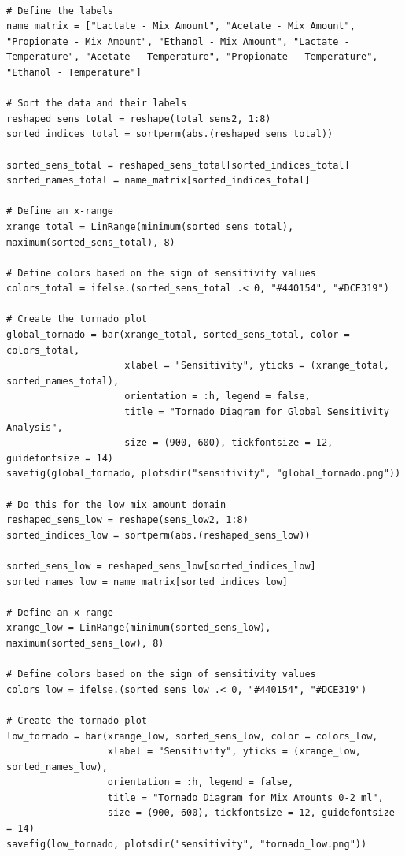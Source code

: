 \documentclass[11pt]{article}
\begin{document}
\begin{verbatim}

# Define the labels
name_matrix = ["Lactate - Mix Amount", "Acetate - Mix Amount", "Propionate - Mix Amount", "Ethanol - Mix Amount", "Lactate - Temperature", "Acetate - Temperature", "Propionate - Temperature", "Ethanol - Temperature"]

# Sort the data and their labels
reshaped_sens_total = reshape(total_sens2, 1:8)
sorted_indices_total = sortperm(abs.(reshaped_sens_total))

sorted_sens_total = reshaped_sens_total[sorted_indices_total]
sorted_names_total = name_matrix[sorted_indices_total]

# Define an x-range
xrange_total = LinRange(minimum(sorted_sens_total), maximum(sorted_sens_total), 8)

# Define colors based on the sign of sensitivity values
colors_total = ifelse.(sorted_sens_total .< 0, "#440154", "#DCE319")

# Create the tornado plot
global_tornado = bar(xrange_total, sorted_sens_total, color = colors_total,
                     xlabel = "Sensitivity", yticks = (xrange_total, sorted_names_total),
                     orientation = :h, legend = false,
                     title = "Tornado Diagram for Global Sensitivity Analysis",
                     size = (900, 600), tickfontsize = 12, guidefontsize = 14)
savefig(global_tornado, plotsdir("sensitivity", "global_tornado.png"))

# Do this for the low mix amount domain
reshaped_sens_low = reshape(sens_low2, 1:8)
sorted_indices_low = sortperm(abs.(reshaped_sens_low))

sorted_sens_low = reshaped_sens_low[sorted_indices_low]
sorted_names_low = name_matrix[sorted_indices_low]

# Define an x-range
xrange_low = LinRange(minimum(sorted_sens_low), maximum(sorted_sens_low), 8)

# Define colors based on the sign of sensitivity values
colors_low = ifelse.(sorted_sens_low .< 0, "#440154", "#DCE319")

# Create the tornado plot
low_tornado = bar(xrange_low, sorted_sens_low, color = colors_low,
                  xlabel = "Sensitivity", yticks = (xrange_low, sorted_names_low),
                  orientation = :h, legend = false,
                  title = "Tornado Diagram for Mix Amounts 0-2 ml",
                  size = (900, 600), tickfontsize = 12, guidefontsize = 14)
savefig(low_tornado, plotsdir("sensitivity", "tornado_low.png"))


\end{verbatim}
\end{document}
